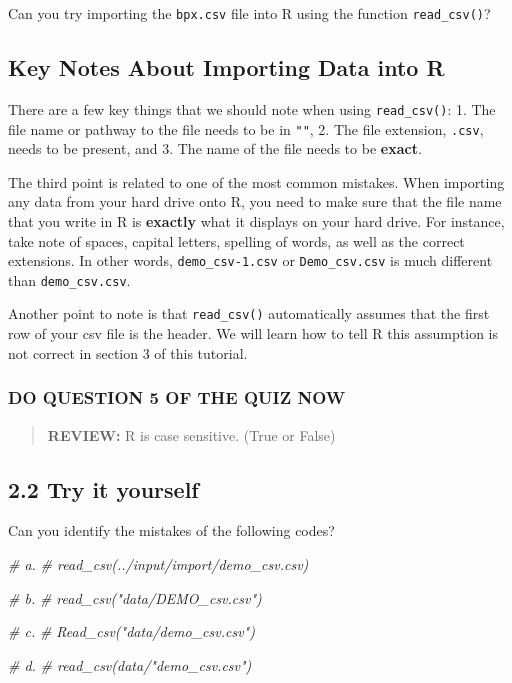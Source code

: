 \documentclass[
]{book}
\newenvironment{Shaded}{\begin{snugshade}}{\end{snugshade}}
\newcommand{\CommentTok}[1]{\textcolor[rgb]{0.56,0.35,0.01}{\textit{#1}}}
\begin{document}
Can you try importing the \texttt{bpx.csv} file into R using the function \texttt{read\_csv()}?

\hypertarget{key-notes-about-importing-data-into-r}{%
\subsection{Key Notes About Importing Data into R}\label{key-notes-about-importing-data-into-r}}

There are a few key things that we should note when using \texttt{read\_csv()}:
1. The file name or pathway to the file needs to be in \texttt{""},
2. The file extension, \texttt{.csv}, needs to be present, and
3. The name of the file needs to be \textbf{exact}.

The third point is related to one of the most common mistakes. When importing any data from your hard drive onto R, you need to make sure that the file name that you write in R is \textbf{exactly} what it displays on your hard drive. For instance, take note of spaces, capital letters, spelling of words, as well as the correct extensions. In other words, \texttt{demo\_csv-1.csv} or \texttt{Demo\_csv.csv} is much different than \texttt{demo\_csv.csv}.

Another point to note is that \texttt{read\_csv()} automatically assumes that the first row of your csv file is the header. We will learn how to tell R this assumption is not correct in section 3 of this tutorial.

\hypertarget{do-question-5-of-the-quiz-now-1}{%
\subsubsection{DO QUESTION 5 OF THE QUIZ NOW}\label{do-question-5-of-the-quiz-now-1}}

\begin{quote}
\textbf{REVIEW:} R is case sensitive. (True or False)
\end{quote}

\hypertarget{try-it-yourself-10}{%
\subsection{2.2 Try it yourself}\label{try-it-yourself-10}}

Can you identify the mistakes of the following codes?

\begin{Shaded}
\begin{Highlighting}[]
\CommentTok{\# a. }
\CommentTok{\# read\_csv(../input/import/demo\_csv.csv)}

\CommentTok{\# b.}
\CommentTok{\# read\_csv("data/DEMO\_csv.csv")}

\CommentTok{\# c.}
\CommentTok{\# Read\_csv("data/demo\_csv.csv")}

\CommentTok{\# d. }
\CommentTok{\# read\_csv(data/"demo\_csv.csv")}
\end{Highlighting}
\end{Shaded}
\end{document}
